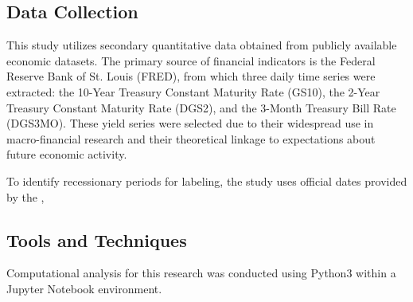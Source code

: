 
\subsection{Data Collection}

This study utilizes secondary quantitative data obtained from publicly available economic datasets. The primary source of financial indicators is the Federal Reserve Bank of St. Louis (FRED), from which three daily time series were extracted: the 10-Year Treasury Constant Maturity Rate (GS10), the 2-Year Treasury Constant Maturity Rate (DGS2), and the 3-Month Treasury Bill Rate (DGS3MO). These yield series were selected due to their widespread use in macro-financial research and their theoretical linkage to expectations about future economic activity.

To identify recessionary periods for labeling, the study uses official dates provided by the 
\textcite{NBERRecession}, %


\subsection{Tools and Techniques}

Computational analysis for this research was conducted using Python3 within a Jupyter Notebook environment. %


